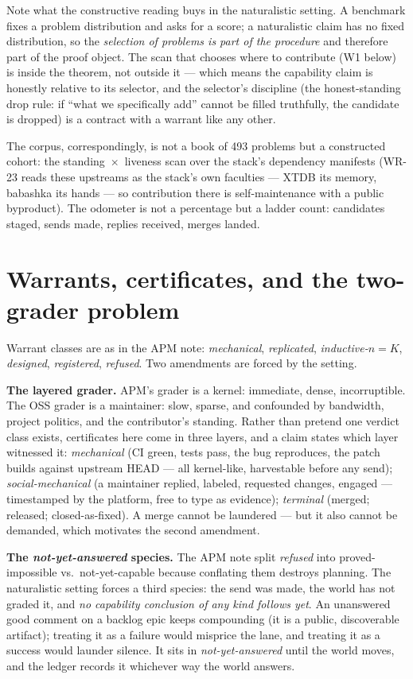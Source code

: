 \documentclass[11pt]{article}
\newcommand{\warrant}[1]{\textsl{#1}}
\begin{document}
Note what the constructive reading buys in the naturalistic setting.
A benchmark fixes a problem distribution and asks for a score; a
naturalistic claim has no fixed distribution, so the
\emph{selection of problems is part of the procedure} and therefore
part of the proof object. The scan that chooses where to contribute
(W1 below) is inside the theorem, not outside it --- which means the
capability claim is honestly relative to its selector, and the
selector's discipline (the honest-standing drop rule: if ``what we
specifically add'' cannot be filled truthfully, the candidate is
dropped) is a contract with a warrant like any other.

The corpus, correspondingly, is not a book of 493 problems but a
constructed cohort: the standing~$\times$~liveness scan over the
stack's dependency manifests (WR-23 reads these upstreams as the
stack's own faculties --- XTDB its memory, babashka its hands --- so
contribution there is self-maintenance with a public byproduct).
The odometer is not a percentage but a ladder count: candidates
staged, sends made, replies received, merges landed.

\section{Warrants, certificates, and the two-grader problem}

Warrant classes are as in the APM note: \warrant{mechanical},
\warrant{replicated}, \warrant{inductive-$n{=}K$}, \warrant{designed},
\warrant{registered}, \warrant{refused}. Two amendments are forced by
the setting.

\textbf{The layered grader.} APM's grader is a kernel: immediate,
dense, incorruptible. The OSS grader is a maintainer: slow, sparse,
and confounded by bandwidth, project politics, and the contributor's
standing. Rather than pretend one verdict class exists, certificates
here come in three layers, and a claim states which layer witnessed
it: \emph{mechanical} (CI green, tests pass, the bug reproduces, the
patch builds against upstream HEAD --- all kernel-like, harvestable
before any send); \emph{social-mechanical} (a maintainer replied,
labeled, requested changes, engaged --- timestamped by the platform,
free to type as evidence); \emph{terminal} (merged; released;
closed-as-fixed). A merge cannot be laundered --- but it also cannot
be demanded, which motivates the second amendment.

\textbf{The \emph{not-yet-answered} species.} The APM note split
\warrant{refused} into proved-impossible vs.\ not-yet-capable because
conflating them destroys planning. The naturalistic setting forces a
third species: the send was made, the world has not graded it, and
\emph{no capability conclusion of any kind follows yet}. An
unanswered good comment on a backlog epic keeps compounding (it is a
public, discoverable artifact); treating it as a failure would
misprice the lane, and treating it as a success would launder
silence. It sits in \emph{not-yet-answered} until the world moves,
and the ledger records it whichever way the world answers.
\end{document}
